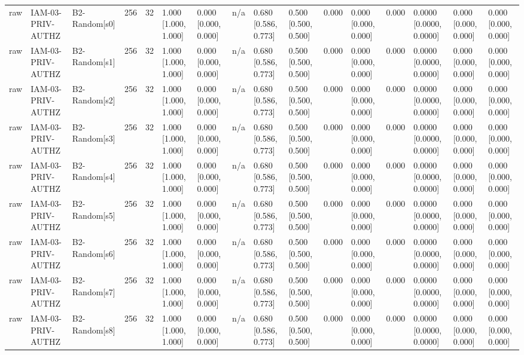 \begin{table}[!ht]
{\begin{tabular}{llllllllllllllll}
raw & IAM-03-PRIV-AUTHZ & B2-Random[s0] & 256 & 32 & 1.000 [1.000, 1.000] & 0.000 [0.000, 0.000] & n/a & 0.680 [0.586, 0.773] & 0.500 [0.500, 0.500] & 0.000 & 0.000 [0.000, 0.000] & 0.000 & 0.0000 [0.0000, 0.0000] & 0.000 [0.000, 0.000] & 0.000 [0.000, 0.000] \\
raw & IAM-03-PRIV-AUTHZ & B2-Random[s1] & 256 & 32 & 1.000 [1.000, 1.000] & 0.000 [0.000, 0.000] & n/a & 0.680 [0.586, 0.773] & 0.500 [0.500, 0.500] & 0.000 & 0.000 [0.000, 0.000] & 0.000 & 0.0000 [0.0000, 0.0000] & 0.000 [0.000, 0.000] & 0.000 [0.000, 0.000] \\
raw & IAM-03-PRIV-AUTHZ & B2-Random[s2] & 256 & 32 & 1.000 [1.000, 1.000] & 0.000 [0.000, 0.000] & n/a & 0.680 [0.586, 0.773] & 0.500 [0.500, 0.500] & 0.000 & 0.000 [0.000, 0.000] & 0.000 & 0.0000 [0.0000, 0.0000] & 0.000 [0.000, 0.000] & 0.000 [0.000, 0.000] \\
raw & IAM-03-PRIV-AUTHZ & B2-Random[s3] & 256 & 32 & 1.000 [1.000, 1.000] & 0.000 [0.000, 0.000] & n/a & 0.680 [0.586, 0.773] & 0.500 [0.500, 0.500] & 0.000 & 0.000 [0.000, 0.000] & 0.000 & 0.0000 [0.0000, 0.0000] & 0.000 [0.000, 0.000] & 0.000 [0.000, 0.000] \\
raw & IAM-03-PRIV-AUTHZ & B2-Random[s4] & 256 & 32 & 1.000 [1.000, 1.000] & 0.000 [0.000, 0.000] & n/a & 0.680 [0.586, 0.773] & 0.500 [0.500, 0.500] & 0.000 & 0.000 [0.000, 0.000] & 0.000 & 0.0000 [0.0000, 0.0000] & 0.000 [0.000, 0.000] & 0.000 [0.000, 0.000] \\
raw & IAM-03-PRIV-AUTHZ & B2-Random[s5] & 256 & 32 & 1.000 [1.000, 1.000] & 0.000 [0.000, 0.000] & n/a & 0.680 [0.586, 0.773] & 0.500 [0.500, 0.500] & 0.000 & 0.000 [0.000, 0.000] & 0.000 & 0.0000 [0.0000, 0.0000] & 0.000 [0.000, 0.000] & 0.000 [0.000, 0.000] \\
raw & IAM-03-PRIV-AUTHZ & B2-Random[s6] & 256 & 32 & 1.000 [1.000, 1.000] & 0.000 [0.000, 0.000] & n/a & 0.680 [0.586, 0.773] & 0.500 [0.500, 0.500] & 0.000 & 0.000 [0.000, 0.000] & 0.000 & 0.0000 [0.0000, 0.0000] & 0.000 [0.000, 0.000] & 0.000 [0.000, 0.000] \\
raw & IAM-03-PRIV-AUTHZ & B2-Random[s7] & 256 & 32 & 1.000 [1.000, 1.000] & 0.000 [0.000, 0.000] & n/a & 0.680 [0.586, 0.773] & 0.500 [0.500, 0.500] & 0.000 & 0.000 [0.000, 0.000] & 0.000 & 0.0000 [0.0000, 0.0000] & 0.000 [0.000, 0.000] & 0.000 [0.000, 0.000] \\
raw & IAM-03-PRIV-AUTHZ & B2-Random[s8] & 256 & 32 & 1.000 [1.000, 1.000] & 0.000 [0.000, 0.000] & n/a & 0.680 [0.586, 0.773] & 0.500 [0.500, 0.500] & 0.000 & 0.000 [0.000, 0.000] & 0.000 & 0.0000 [0.0000, 0.0000] & 0.000 [0.000, 0.000] & 0.000 [0.000, 0.000] \\

\end{tabular}}
\end{table}
